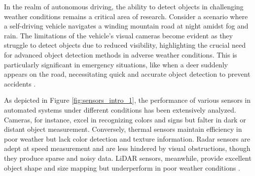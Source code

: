 \documentclass[report.tex]{subfiles}
\begin{document}


        In the realm of autonomous driving, the ability to detect objects in challenging weather conditions remains a critical area of research. Consider a scenario where a self-driving vehicle navigates a winding mountain road at night amidst fog and rain. The limitations of the vehicle's visual cameras become evident as they struggle to detect objects due to reduced visibility, highlighting the crucial need for advanced object detection methods in adverse weather conditions. This is particularly significant in emergency situations, like when a deer suddenly appears on the road, necessitating quick and accurate object detection to prevent accidents \cite{yurtsever2020survey} \cite{carballo2020libre} \cite{mcity2020}.

        As depicted in Figure \ref{fig:sensors_intro_1}, the performance of various sensors in automated systems under different conditions has been extensively analyzed. Cameras, for instance, excel in recognizing colors and signs but falter in dark or distant object measurement. Conversely, thermal sensors maintain efficiency in poor weather but lack color detection and texture information. Radar sensors are adept at speed measurement and are less hindered by visual obstructions, though they produce sparse and noisy data. LiDAR sensors, meanwhile, provide excellent object shape and size mapping but underperform in poor weather conditions \cite{yeong2021sensor}.
\end{document}
